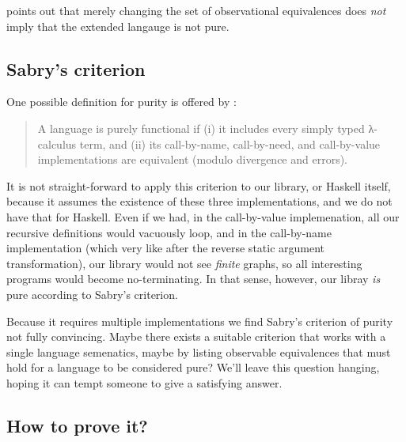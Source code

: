 \documentclass[manuscript,screen,acmsmall]{acmart}
\begin{document}
 points out that merely changing the set of observational equivalences does \emph{not} imply that the extended langauge is not pure.

\subsection{Sabry's criterion}

One possible definition for purity is offered by \citet{sabry}:
\begin{quote}
A language is purely functional if (i) it includes every simply typed λ-calculus term, and
(ii) its call-by-name, call-by-need, and call-by-value implementations are equivalent (modulo
divergence and errors).
\end{quote}

It is not straight-forward to apply this criterion to our library, or Haskell itself, because it assumes the existence of these three implementations, and we do not have that for Haskell. Even if we had, in the call-by-value implemenation, all our recursive definitions would vacuously loop, and in the call-by-name implementation (which very like after the reverse static argument transformation), our library would not see \emph{finite} graphs, so all interesting programs would become no-terminating. In that sense, however, our libray \emph{is} pure according to Sabry’s criterion.

Because it requires multiple implementations we find Sabry’s criterion of purity not fully convincing. Maybe there exists a suitable criterion that works with a single language semenatics, maybe by listing observable equivalences that must hold for a language to be considered pure?
We'll leave this question hanging, hoping it can tempt someone to give a satisfying answer.

% 


\subsection{How to prove it?}
\end{document}

